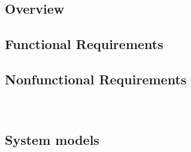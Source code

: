 \subsection{Overview}
\subsection{Functional Requirements}
\subsection{Nonfunctional Requirements}				%
	\subsubsection*{}
	\\

\subsection{System models}							%
	